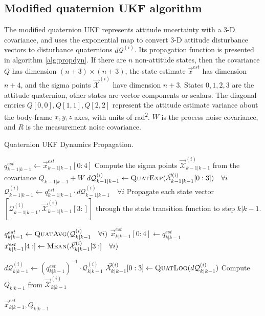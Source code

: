 \documentclass[conference]{IEEEtran}
\begin{document}
\subsection{Modified quaternion UKF algorithm}
The modified quaternion UKF \cite{1257247} represents attitude uncertainty with a 3-D covariance, and uses the exponential map to convert 3-D attitude disturbance vectors to disturbance quaternions $d\mathcal{Q}^{(i)}$. Its propagation function is presented in algorithm \ref{alg:propdyn}. If there are $n$ non-attitude states, then the covariance $Q$ has dimension $(n+3) \times (n+3)$, the state estimate $\vec{x}^{est}$ has dimension $n+4$, and the sigma points $\vec{\mathcal{X}}^{(i)}$ have dimension $n+3$. States $0, 1, 2, 3$ are the attitude quaternion, other states are vector components or scalars. The diagonal entries $Q[0,0], Q[1,1], Q[2,2]$ represent the attitude estimate variance about the body-frame $x,y,z$ axes, with units of \si{\radian\squared}. $W$ is the process noise covariance, and $R$ is the measurement noise covariance.\\

\begin{algorithm}
  \caption{Quaternion UKF Dynamics Propagation.}
  \label{alg:propdyn}
  \begin{algorithmic}
      \State $q_{k-1|k-1}^{est} \gets \vec{x}_{k-1|k-1}^{est}[0:4]$
      \State Compute the sigma points $\vec{\mathcal{X}}^{(i)}_{k-1|k-1}$ from the covariance $Q_{k-1|k-1} + W$
      \State $d\mathcal{Q}^{(i)}_{k-1|k-1} \gets \textproc{QuatExp}(\vec{\mathcal{X}}^{(i)}_{k-1|k-1}[0:3]) \quad \forall i$
      \State $\mathcal{Q}^{(i)}_{k-1|k-1} \gets q_{k-1|k-1}^{est} \cdot d\mathcal{Q}^{(i)}_{k-1|k-1} \quad \forall i$
      \State Propagate each state vector $[\mathcal{Q}^{(i)}_{k-1|k-1}, \vec{\mathcal{X}}^{(i)}_{k-1|k-1}[3:]]$ through the state transition function to step $k|k-1$.

      \State $q_{k|k-1}^{est} \gets \textproc{QuatAvg}(\mathcal{Q}^{(i)}_{k|k-1} \quad \forall i)$
      \State $\vec{x}_{k|k-1}^{est}[0:4] \gets q_{k|k-1}^{est}$
      \State $\vec{x}_{k|k-1}^{est}[4:] \gets \textproc{Mean}(\vec{\mathcal{X}}^{(i)}_{k|k-1}[3:] \quad \forall i)$

      \State $d\mathcal{Q}^{(i)}_{k|k-1} \gets (q_{k|k-1}^{est})^{-1} \cdot \mathcal{Q}^{(i)}_{k|k-1}$
      \State $\vec{\mathcal{X}}^{(i)}_{k|k-1}[0:3] \gets \textproc{QuatLog}(d\mathcal{Q}^{(i)}_{k|k-1})$
      \State Compute $Q_{k|k-1}$ from $\vec{\mathcal{X}}^{(i)}_{k|k-1}$

      \Return $\vec{x}_{k|k-1}^{est}, Q_{k|k-1}$
      \EndFunction
  \end{algorithmic}
\end{algorithm}
\end{document}
